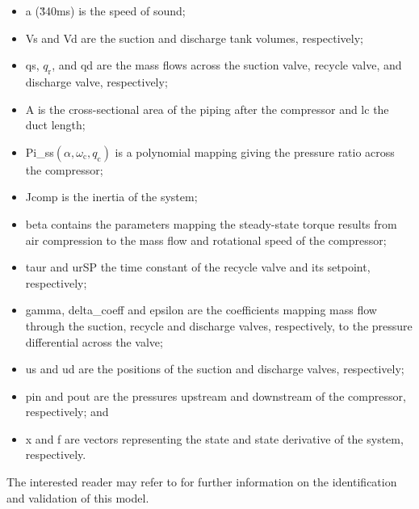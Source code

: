 \begin{itemize}[noitemsep]
  \item \gls{a} (\u{340}{m\per s}) is the speed of sound;
  \item \gls{Vs} and \gls{Vd} are the suction and discharge tank volumes, respectively;
  \item \gls{qs}, $q_\text{r}$, and \gls{qd} are the mass flows across the suction valve, recycle valve, and discharge valve, respectively;
  \item \gls{A} is the cross-sectional area of the piping after the compressor and \gls{lc} the duct length;
  \item \gls{Pi_ss}$\left(\alpha,\omega_\text{c}, q_\text{c} \right)$ is a polynomial mapping giving the pressure ratio across the compressor;
  \item \gls{Jcomp} is the inertia of the system;
  \item \gls{beta} contains the parameters mapping the steady-state torque results from air compression to the mass flow and rotational speed of the compressor;
  \item \gls{taur} and \gls{urSP} the time constant of the recycle valve and its setpoint, respectively;
  \item \gls{gamma}, \gls{delta_coeff} and \gls{epsilon} are the coefficients mapping mass flow through the suction, recycle and discharge valves, respectively, to the pressure differential across the valve;
  \item \gls{us} and \gls{ud} are the positions of the suction and discharge valves, respectively;
  \item \gls{pin} and \gls{pout} are the pressures upstream and downstream of the compressor, respectively; and
  \item \gls{x} and \gls{f} are vectors representing the state and state derivative of the system, respectively.
\end{itemize}

The interested reader may refer to \cite{Cortinovis2015} for further information on the identification and validation of this model.



